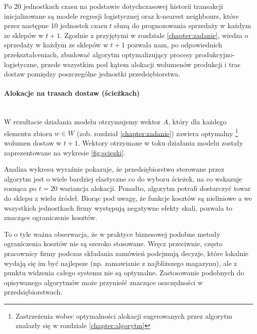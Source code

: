 \documentclass[polish, twoside, 12pt, a4paper]{article}
\theoremstyle{definition}
\theoremstyle{plain}
\theoremstyle{remark}
\begin{document}
Po 20 jednostkach czasu na podstawie dotychczasowej historii transakcji inicjalizowane są modele regresji logistycznej oraz k-nearest neighbours, które przez następne 10 jednostek czasu $t$ słuzą do prognozowania sprzedaży w każdym ze sklepów w $t+1$. Zgodnie z przyjętymi w rozdziale \ref{chapter:zadanie}, wiedza o sprzedaży w każdym ze sklepów w $t+1$ pozwala nam, po odpowiednich przekształceniach, zbudować algorytm optymalizujący procesy produkcyjno-logistyczne, przede wszystkim pod kątem alokacji wolumenów produkcji i tras dostaw pomiędzy poszczególne jednostki przedsiębiorstwa. 

\paragraph{Alokacje na trasach dostaw (ścieżkach)}\mbox{}\\

W rezultacie działania modelu otrzymujemy wektor $A$, który dla każdego elementu zbioru $w \in W$ (zob. rozdział \ref{chapter:zadanie}) zawiera optymalny \footnote{Zastrzeżenia wobec optymalności alokacji sugerowanych przez algorytm znalazły się w rozdziale \ref{chapter:algorytm}} wolumen dostaw w $t+1$. Wektory otrzymane w toku działania modelu zostały zaprezentowane na wykresie \ref{fig:sciezki}.

Analiza wykresu wyraźnie pokazuje, że przedsiębiorstwo sterowane przez algorytm jest o wiele bardziej elastyczne co do wyboru ścieżek, na co wskazuje rosnąca po $t=20$ wariancja alokacji. Ponadto, algorytm potrafi dostarczyć towar do sklepu z wielu źródeł. Biorąc pod uwagę, że funkcje kosztów są nieliniowe a we wszystkich jednostkach firmy występują negatywne efekty skali, pozwala to znaczące ograniczenie kosztów. 

To o tyle ważna obserwacja, że w praktyce biznesowej podobne metody ograniczenia kosztów nie są szeroko stosowane. Wręcz przeciwnie, często pracownicy firmy podczas składania zamówień podejmują decyzje, które lokalnie wydają się im być najlepsze (np. zamawianie z najbliższego magazynu), ale z punktu widzenia całego systemu nie są optymalne. Zastosowanie podobnych do opisywanego algorytmów może przynieść znaczące oszczędności w przedsiębiorstwach. 
\end{document}
